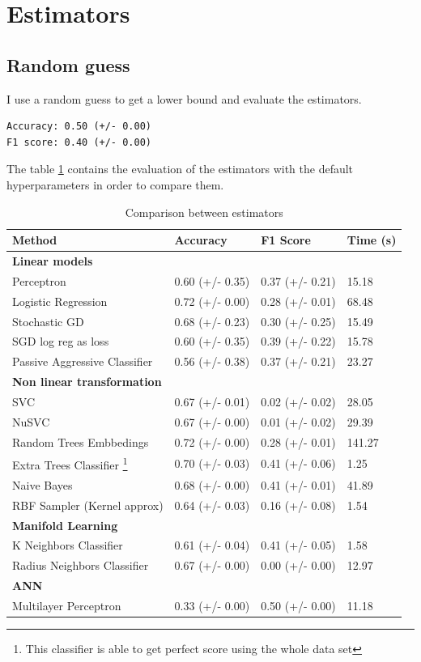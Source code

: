 \documentclass[a4paper]{article}
\begin{document}
\section{Estimators}

\subsection{Random guess}
I use a random guess to get a lower bound and evaluate the estimators.
\begin{verbatim}
Accuracy: 0.50 (+/- 0.00)
F1 score: 0.40 (+/- 0.00)
\end{verbatim}

The table \ref{tab:estimators} contains the evaluation of the estimators
with the default hyperparameters in order to compare them.

\begin{table}[]
\centering
\caption{Comparison between estimators}
\label{tab:estimators}
\begin{tabular}{llll}
\hline
\multicolumn{1}{l}{\textbf{Method}} & \multicolumn{1}{l}{\textbf{Accuracy}} & \multicolumn{1}{l}{\textbf{F1 Score}} & \multicolumn{1}{l}{\textbf{Time (s)}} \\ \hline
\textbf{Linear models} & & & \\ \hline
Perceptron & 0.60 (+/- 0.35) & 0.37 (+/- 0.21) & 15.18  \\
Logistic Regression & 0.72 (+/- 0.00) & 0.28 (+/- 0.01) & 68.48 \\
Stochastic GD & 0.68 (+/- 0.23) & 0.30 (+/- 0.25) & 15.49 \\
SGD log reg as loss & 0.60 (+/- 0.35) & 0.39 (+/- 0.22) & 15.78 \\
Passive Aggressive Classifier & 0.56 (+/- 0.38) & 0.37 (+/- 0.21) & 23.27 \\
\textbf{Non linear transformation} & & & \\ \hline
SVC & 0.67 (+/- 0.01) & 0.02 (+/- 0.02) & 28.05 \\
NuSVC & 0.67 (+/- 0.00) & 0.01 (+/- 0.02) & 29.39 \\
Random Trees Embbedings & 0.72 (+/- 0.00) & 0.28 (+/- 0.01) & 141.27 \\
Extra Trees Classifier \footnote{This classifier is able to
get perfect score using the whole data set}
& 0.70 (+/- 0.03) & 0.41 (+/- 0.06) & 1.25 \\
Naive Bayes & 0.68 (+/- 0.00) & 0.41 (+/- 0.01) & 41.89 \\
RBF Sampler (Kernel approx) & 0.64 (+/- 0.03) & 0.16 (+/- 0.08)
& 1.54 \\
\textbf{Manifold Learning} & & & \\ \hline
K Neighbors Classifier & 0.61 (+/- 0.04) & 0.41 (+/- 0.05) & 1.58 \\
Radius Neighbors Classifier & 0.67 (+/- 0.00) & 0.00 (+/- 0.00) & 12.97 \\
\textbf{ANN} & & & \\ \hline
Multilayer Perceptron & 0.33 (+/- 0.00) & 0.50 (+/- 0.00) & 11.18 \\
\end{tabular}
\end{table}
\end{document}
